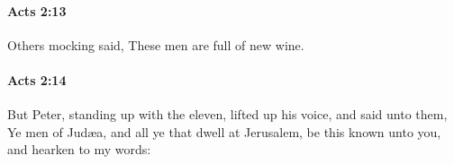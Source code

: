 		\paragraph{Acts 2:13} %
			\label{ACTS-2-13}

			Others mocking said, These men are full of new wine.

			\begin{framed}
			\scriptsize
				\begin{compactdesc}
					\item[SBLG] 
				\end{compactdesc}
			\end{framed}

		\paragraph{Acts 2:14} %
			\label{ACTS-2-14}

			But Peter, standing up with the eleven, lifted up his voice, and said unto them, Ye men of Judæa, and all ye that dwell at Jerusalem, be this known unto you, and hearken to my words:

